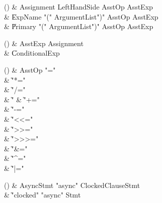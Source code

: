 \begin{bbgrammarappendix}{4.0in}

() & Assignment \label{prod:Assignment}  \: LeftHandSide AsstOp AsstExp  \\

 &    \| ExpName  \xcd"(" ArgumentList\opt \xcd")" AsstOp AsstExp \\
 &    \| Primary  \xcd"(" ArgumentList\opt \xcd")" AsstOp AsstExp \\

\end{bbgrammarappendix}

\begin{bbgrammarappendix}{4.3in}

() & AsstExp \label{prod:AsstExp}  \: Assignment  \\

 &    \| ConditionalExp \\

\end{bbgrammarappendix}

\begin{bbgrammarappendix}{4.4in}

() & AsstOp \label{prod:AsstOp}  \: \xcd"="  \\

 &    \| \xcd"*=" \\
 &    \| \xcd"/=" \\
 &    \| \xcd"%
 &    \| \xcd"+=" \\
 &    \| \xcd"-=" \\
 &    \| \xcd"<<=" \\
 &    \| \xcd">>=" \\
 &    \| \xcd">>>=" \\
 &    \| \xcd"&=" \\
 &    \| \xcd"^=" \\
 &    \| \xcd"|=" \\

\end{bbgrammarappendix}

\begin{bbgrammarappendix}{4.1in}

() & AsyncStmt \label{prod:AsyncStmt}  \: \xcd"async" ClockedClause\opt Stmt  \\

 &    \| \xcd"clocked" \xcd"async" Stmt \\

\end{bbgrammarappendix}

